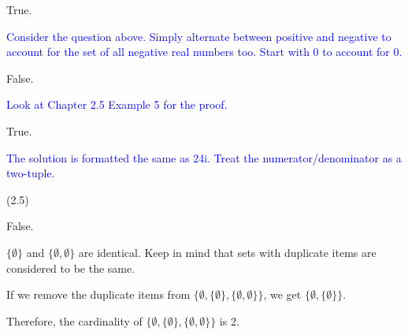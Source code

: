 \documentclass{exam}
\begin{document}
\begin{questions}
\begin{subparts}
\begin{center}
True.

\textcolor{blue}{Consider the question above. Simply alternate between positive and negative to account for the set of all negative real numbers too. Start with 0 to account for 0.}

\end{center}


\begin{center}

False.

\textcolor{blue}{Look at Chapter 2.5 Example 5 for the proof.}

\end{center}


\begin{center}

True.

\textcolor{blue}{The solution is formatted the same as 24i. Treat the numerator/denominator as a two-tuple.}

\end{center}

\end{subparts}

 (2.5)

\begin{center}

False.

\( \{\emptyset\} \) and \( \{\emptyset, \emptyset\} \) are identical. Keep in mind that sets with duplicate items are considered to be the same.

If we remove the duplicate items from \( \{\emptyset, \{\emptyset\}, \{\emptyset, \emptyset\}\} \), we get \( \{\emptyset, \{\emptyset\} \}\).

Therefore, the cardinality of \( \{\emptyset, \{\emptyset\}, \{\emptyset, \emptyset\}\} \) is 2.

\end{center}



\begin{center}


\end{center}
\end{questions}
\end{document}
